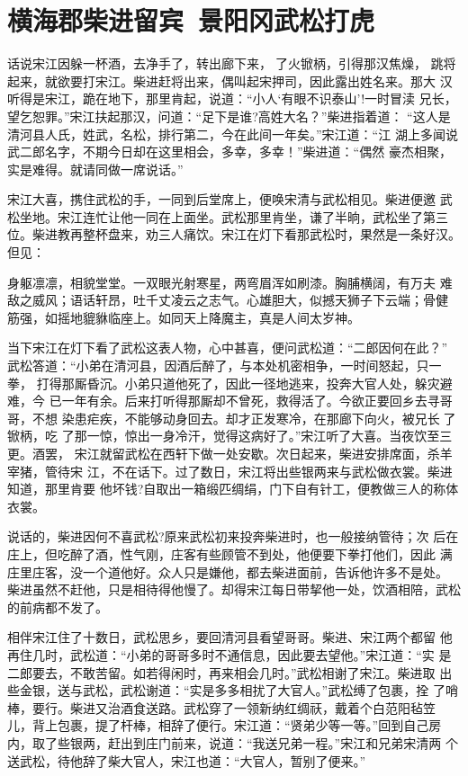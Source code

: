 \chapter{横海郡柴进留宾~景阳冈武松打虎}

话说宋江因躲一杯酒，去净手了，转出廊下来，了火锨柄，引得那汉焦燥，
跳将起来，就欲要打宋江。柴进赶将出来，偶叫起宋押司，因此露出姓名来。那大
汉听得是宋江，跪在地下，那里肯起，说道：“小人‘有眼不识泰山’!一时冒渎
兄长，望乞恕罪。”宋江扶起那汉，问道：“足下是谁?高姓大名？”柴进指着道：
“这人是清河县人氏，姓武，名松，排行第二，今在此间一年矣。”宋江道：“江
湖上多闻说武二郎名字，不期今日却在这里相会，多幸，多幸！”柴进道：“偶然
豪杰相聚，实是难得。就请同做一席说话。”

宋江大喜，携住武松的手，一同到后堂席上，便唤宋清与武松相见。柴进便邀
武松坐地。宋江连忙让他一同在上面坐。武松那里肯坐，谦了半晌，武松坐了第三
位。柴进教再整杯盘来，劝三人痛饮。宋江在灯下看那武松时，果然是一条好汉。
但见：

身躯凛凛，相貌堂堂。一双眼光射寒星，两弯眉浑如刷漆。胸脯横阔，有万夫
难敌之威风；语话轩昂，吐千丈凌云之志气。心雄胆大，似撼天狮子下云端；骨健
筋强，如摇地貔貅临座上。如同天上降魔主，真是人间太岁神。

当下宋江在灯下看了武松这表人物，心中甚喜，便问武松道：“二郎因何在此？”
武松答道：“小弟在清河县，因酒后醉了，与本处机密相争，一时间怒起，只一拳，
打得那厮昏沉。小弟只道他死了，因此一径地逃来，投奔大官人处，躲灾避难，今
已一年有余。后来打听得那厮却不曾死，救得活了。今欲正要回乡去寻哥哥，不想
染患疟疾，不能够动身回去。却才正发寒冷，在那廊下向火，被兄长了锨柄，吃
了那一惊，惊出一身冷汗，觉得这病好了。”宋江听了大喜。当夜饮至三更。酒罢，
宋江就留武松在西轩下做一处安歇。次日起来，柴进安排席面，杀羊宰猪，管待宋
江，不在话下。过了数日，宋江将出些银两来与武松做衣裳。柴进知道，那里肯要
他坏钱?自取出一箱缎匹绸绢，门下自有针工，便教做三人的称体衣裳。

说话的，柴进因何不喜武松?原来武松初来投奔柴进时，也一般接纳管待；次
后在庄上，但吃醉了酒，性气刚，庄客有些顾管不到处，他便要下拳打他们，因此
满庄里庄客，没一个道他好。众人只是嫌他，都去柴进面前，告诉他许多不是处。
柴进虽然不赶他，只是相待得他慢了。却得宋江每日带挈他一处，饮酒相陪，武松
的前病都不发了。

相伴宋江住了十数日，武松思乡，要回清河县看望哥哥。柴进、宋江两个都留
他再住几时，武松道：“小弟的哥哥多时不通信息，因此要去望他。”宋江道：“实
是二郎要去，不敢苦留。如若得闲时，再来相会几时。”武松相谢了宋江。柴进取
出些金银，送与武松，武松谢道：“实是多多相扰了大官人。”武松缚了包裹，拴
了哨棒，要行。柴进又治酒食送路。武松穿了一领新纳红绸祆，戴着个白范阳毡笠
儿，背上包裹，提了杆棒，相辞了便行。宋江道：“贤弟少等一等。”回到自己房
内，取了些银两，赶出到庄门前来，说道：“我送兄弟一程。”宋江和兄弟宋清两
个送武松，待他辞了柴大官人，宋江也道：“大官人，暂别了便来。”

